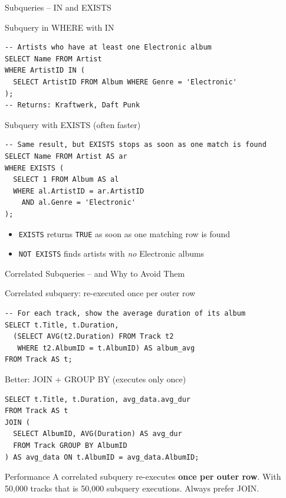 \begin{frame}[fragile]{Subqueries -- IN and EXISTS}
  \begin{block}{Subquery in WHERE with IN}
\begin{lstlisting}[style=sqlstyle]
-- Artists who have at least one Electronic album
SELECT Name FROM Artist
WHERE ArtistID IN (
  SELECT ArtistID FROM Album WHERE Genre = 'Electronic'
);
-- Returns: Kraftwerk, Daft Punk
\end{lstlisting}
  \end{block}

  \begin{block}{Subquery with EXISTS (often faster)}
\begin{lstlisting}[style=sqlstyle]
-- Same result, but EXISTS stops as soon as one match is found
SELECT Name FROM Artist AS ar
WHERE EXISTS (
  SELECT 1 FROM Album AS al
  WHERE al.ArtistID = ar.ArtistID
    AND al.Genre = 'Electronic'
);
\end{lstlisting}
  \end{block}

  \begin{itemize}
    \item \texttt{EXISTS} returns \texttt{TRUE} as soon as one matching row is found
    \item \texttt{NOT EXISTS} finds artists with \emph{no} Electronic albums
  \end{itemize}
\end{frame}

\begin{frame}[fragile]{Correlated Subqueries -- and Why to Avoid Them}
  \begin{block}{Correlated subquery: re-executed once per outer row}
\begin{lstlisting}[style=sqlstyle]
-- For each track, show the average duration of its album
SELECT t.Title, t.Duration,
  (SELECT AVG(t2.Duration) FROM Track t2
   WHERE t2.AlbumID = t.AlbumID) AS album_avg
FROM Track AS t;
\end{lstlisting}
  \end{block}

  \begin{block}{Better: JOIN + GROUP BY (executes only once)}
\begin{lstlisting}[style=sqlstyle]
SELECT t.Title, t.Duration, avg_data.avg_dur
FROM Track AS t
JOIN (
  SELECT AlbumID, AVG(Duration) AS avg_dur
  FROM Track GROUP BY AlbumID
) AS avg_data ON t.AlbumID = avg_data.AlbumID;
\end{lstlisting}
  \end{block}

  \begin{alertblock}{Performance}
    A correlated subquery re-executes \textbf{once per outer row}.
    With 50,000 tracks that is 50,000 subquery executions. Always prefer JOIN.
  \end{alertblock}
\end{frame}

